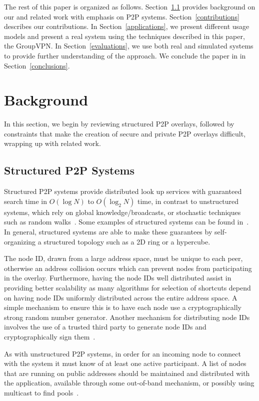\documentclass[conference]{IEEEtran}
\begin{document}
The rest of this paper is organized as follows.  Section~\ref{structured_p2p}
provides background on our and related work with emphasis on P2P systems.
Section~\ref{contributions} describes our contributions.  In
Section~\ref{applications}, we present different usage models and present a
real system using the techniques described in this paper, the GroupVPN.  In
Section~\ref{evaluations}, we use both real and simulated systems to provide
further understanding of the approach.  We conclude the paper in in
Section~\ref{conclusions}.

\section{Background}
\label{background}
In this section, we begin by reviewing structured P2P overlays, followed by
constraints that make the creation of secure and private P2P overlays
difficult, wrapping up with related work.

\subsection{Structured P2P Systems}
\label{structured_p2p}
Structured P2P systems provide distributed look up services with guaranteed
search time in $O(\log N)$ to $O(\log_2 N)$ time, in contrast to unstructured
systems, which rely on global knowledge/broadcasts, or stochastic techniques
such as random walks~\cite{unstructured_v_structured}.  Some examples of
structured systems can be found in~\cite{pastry, chord, symphony, kademlia,
can}.  In general, structured systems are able to make these guarantees by
self-organizing a structured topology such as a 2D ring or a hypercube.

The node ID, drawn from a large address space, must be unique to each peer,
otherwise an address collision occurs which can prevent nodes from participating
in the overlay.  Furthermore, having the node IDs well distributed assist in
providing better scalability as many algorithms for selection of shortcuts
depend on having node IDs uniformly distributed across the entire address space.
A simple mechanism to ensure this is to have each node use a cryptographically
strong random number generator.  Another mechanism for distributing node IDs
involves the use of a trusted third party to generate node IDs and
cryptographically sign them~\cite{secure_routing}.

As with unstructured P2P systems, in order for an incoming node to connect with
the system it must know of at least one active participant.  A list of nodes
that are running on public addresses should be maintained and distributed with
the application, available through some out-of-band mechanism, or possibly using
multicast to find pools~\cite{pastry}.
\end{document}
